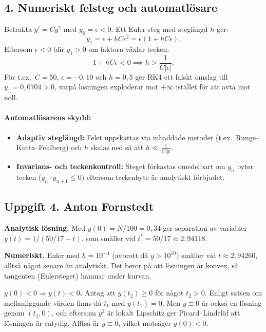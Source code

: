 \documentclass{article}
\begin{document}
\subsection*{4. Numeriskt felsteg och automatlösare}
Betrakta $y' = C y^2$ med $y_0 = \epsilon < 0$. Ett Euler-steg med steglängd $h$ ger:
\begin{equation}
    y_1 = \epsilon + h C \epsilon^2 = \epsilon (1 + h C \epsilon).
\end{equation}
Eftersom $\epsilon < 0$ blir $y_1 > 0$ om faktorn växlar tecken:
\begin{equation}
    1 + h C \epsilon < 0 \implies h > \frac{1}{C |\epsilon|}.
\end{equation}
För t.ex.\ $C = 50$, $\epsilon = -0{,}10$ och $h = 0{,}5$ ger RK4 ett falskt omslag till $y_1 = 0{,}0704 > 0$, varpå lösningen exploderar mot $+\infty$ istället för att avta mot noll.

\paragraph{Automatlösarens skydd:}
\begin{itemize}
    \item \textbf{Adaptiv steglängd:} Felet uppskattas via inbäddade metoder (t.ex.\ Runge--Kutta--Fehlberg) och $h$ skalas ned så att $h \ll \frac{1}{C|y|}$.
    \item \textbf{Invarians- och teckenkontroll:} Steget förkastas omedelbart om $y_n$ byter tecken ($y_n \cdot y_{n+1} \le 0$) eftersom teckenbyte är analytiskt förbjudet.
\end{itemize}

\subsection*{Uppgift 4. Anton Fornstedt}

\textbf{Analytisk lösning.} Med $y(0) = N/100 = 0{,}34$ ger separation av
variabler $y(t) = 1/(50/17 - t)$, som smäller vid $t^* = 50/17 \approx 2{,}94118$.

\medskip
\textbf{Numeriskt.} Euler med $h = 10^{-4}$ (avbrott då $y > 10^{10}$)
smäller vid $t \approx 2{,}94260$, alltså något senare än analytiskt. Det
beror på att lösningen är konvex, så tangenten (Eulersteget) hamnar under
kurvan.

\medskip
\textbf{$y(0) < 0 \Rightarrow y(t) < 0$.} Antag att $y(t_2) \geq 0$ för något
$t_2 > 0$. Enligt satsen om mellanliggande värden finns då $t_1$ med
$y(t_1) = 0$. Men $y \equiv 0$ är också en lösning genom $(t_1, 0)$, och
eftersom $y^2$ är lokalt Lipschitz ger Picard--Lindelöf att lösningen är
entydig. Alltså är $y \equiv 0$, vilket motsäger $y(0) < 0$.
\end{document}
